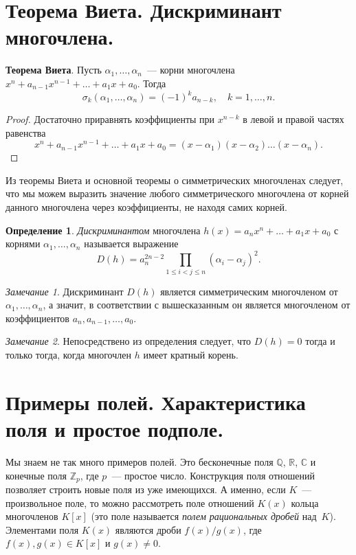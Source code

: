\documentclass[a4paper, 12pt]{article}
\def\CC{{\mathbb C}}%
\def\ZZ{{\mathbb Z}}%
\def\RR{{\mathbb R}}%
\def\QQ{{\mathbb Q}}%
\theoremstyle{definition}
\newtheorem{definition}{Определение}
\theoremstyle{remark}
\newtheorem{remark}{Замечание}
\begin{document}
\section{Теорема Виета. Дискриминант многочлена.}

{\bf Теорема Виета}. Пусть $\alpha_1,\ldots,\alpha_n$~--- корни
многочлена $x^n + a_{n-1}x^{n-1} + \dots + a_1x + a_0$. Тогда
$$
\sigma_k(\alpha_1,\ldots,\alpha_n)=(-1)^k a_{n-k}, \quad k = 1,
\ldots, n.
$$

\begin{proof}
Достаточно приравнять коэффициенты при $x^{n-k}$ в левой и правой
частях равенства
$$
x^n+a_{n-1}x^{n-1}+\dots+a_1x+a_0=(x-\alpha_1)(x-\alpha_2)\ldots
(x-\alpha_n).
$$
\end{proof}

Из теоремы Виета и основной теоремы о симметрических многочленах
следует, что мы можем выразить значение любого симметрического
многочлена от корней данного многочлена через коэффициенты, не
находя самих корней.

\begin{definition}
{\it Дискриминантом} многочлена $h(x)=a_nx^n+\ldots+a_1x+a_0$ с
корнями $\alpha_1, \ldots, \alpha_n$ называется выражение
$$
D(h) = a_n^{2n-2} \prod \limits_{1 \leqslant i < j \leqslant n}
(\alpha_i - \alpha_j)^2.
$$
\end{definition}

\begin{remark}
Дискриминант $D(h)$ является симметрическим многочленом от
$\alpha_1, \ldots, \alpha_n$, а значит, в соответствии с
вышесказанным он является многочленом от коэффициентов $a_n,
a_{n-1}, \ldots, a_0$.
\end{remark}

\begin{remark}
Непосредствено из определения следует, что $D(h) = 0$ тогда и только
тогда, когда многочлен $h$ имеет кратный корень.
\end{remark}


\section{Примеры полей. Характеристика поля и простое подполе.}

Мы знаем не так много примеров полей. Это бесконечные поля $\QQ$,
$\RR$, $\CC$ и конечные поля $\ZZ_p$, где $p$~--- простое число.
Конструкция поля отношений позволяет строить новые поля из уже
имеющихся. А именно, если $K$~--- произвольное поле, то можно
рассмотреть поле отношений $K(x)$ кольца многочленов $K[x]$ (это
поле называется \textit{полем рациональных дробей} над~$K$).
Элементами поля $K(x)$ являются дроби $f(x)/g(x)$, где $f(x), g(x)
\in K[x]$ и $g(x) \ne 0$.
\end{document}
